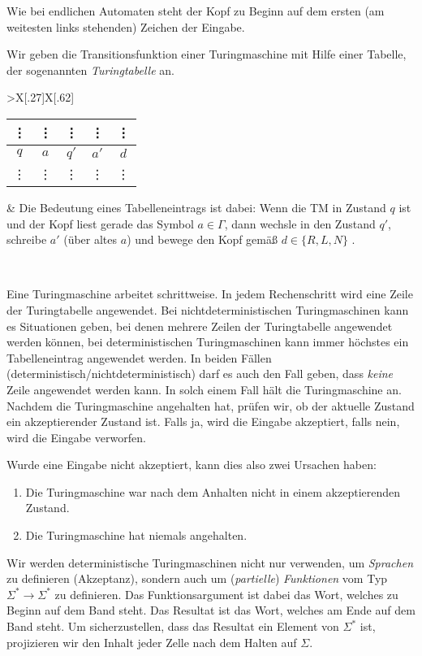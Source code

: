  Wie bei endlichen Automaten steht der Kopf zu Beginn auf dem ersten (am weitesten links stehenden) Zeichen der Eingabe.
 
 \smallskip
 
 Wir geben die Transitionsfunktion einer Turingmaschine mit Hilfe einer Tabelle, der sogenannten \emph{Turingtabelle} an.
 
 \begin{tabu}{>{\bfseries}X[.27]X[.62]}
	\begin{tabular}[t]{|*5{c|}}
		\vdots & \vdots & \vdots & \vdots & \vdots \\\hline
		$q$ & $a$ & $q'$ & $a'$ & $d$ \\\hline
		\vdots & \vdots & \vdots & \vdots & \vdots 
	\end{tabular}
	& 	Die Bedeutung eines Tabelleneintrags ist dabei: Wenn die \ac{TM} in Zustand $q$ ist und der Kopf liest
        gerade das Symbol $a\in\Gamma$, dann wechsle in den Zustand $q'$,
        schreibe $a'$ (über altes $a$) und bewege den Kopf gemäß
        $d\in\{R,L,N\}$ .
\end{tabu}\

Eine Turingmaschine arbeitet schrittweise.
In jedem Rechenschritt wird eine Zeile der Turingtabelle angewendet.
Bei nichtdeterministischen Turingmaschinen kann es Situationen geben, bei denen mehrere Zeilen der Turingtabelle angewendet werden können,
bei deterministischen Turingmaschinen kann immer höchstes ein Tabelleneintrag angewendet werden.
In beiden Fällen (deterministisch/nichtdeterministisch) darf es auch den Fall geben, dass \emph{keine} Zeile angewendet werden kann.
In solch einem Fall hält die Turingmaschine an.
Nachdem die Turingmaschine angehalten hat, prüfen wir, ob der aktuelle Zustand ein akzeptierender Zustand ist.
Falls ja, wird die Eingabe akzeptiert, falls nein, wird die Eingabe verworfen.

Wurde eine Eingabe nicht akzeptiert, kann dies also zwei Ursachen haben:
\begin{enumerate}
 \item Die Turingmaschine war nach dem Anhalten nicht in einem akzeptierenden Zustand.
 \item Die Turingmaschine hat niemals angehalten.
\end{enumerate}

Wir werden deterministische Turingmaschinen nicht nur verwenden, um \emph{Sprachen} zu definieren (Akzeptanz), sondern auch um (\emph{partielle}) \emph{Funktionen} vom Typ $\Sigma^*\rightarrow\Sigma^*$ zu definieren.
Das Funktionsargument ist dabei das Wort, welches zu Beginn auf dem Band steht.
Das Resultat ist das Wort, welches am Ende auf dem Band steht.
Um sicherzustellen, dass das Resultat ein Element von $\Sigma^*$ ist, projizieren wir den Inhalt jeder Zelle nach dem Halten auf $\Sigma$.

